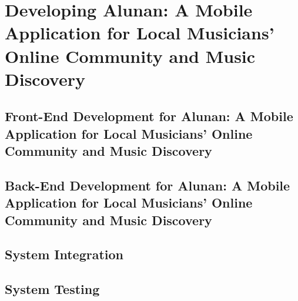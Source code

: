 \section{Developing Alunan: A Mobile Application for Local Musicians’ Online Community and Music Discovery}
\subsection{Front-End Development for Alunan: A Mobile Application for Local Musicians’ Online Community and Music Discovery}

\subsection{Back-End Development for Alunan: A Mobile Application for Local Musicians’ Online Community and Music Discovery}

\subsection{System Integration}

\subsection{System Testing}


